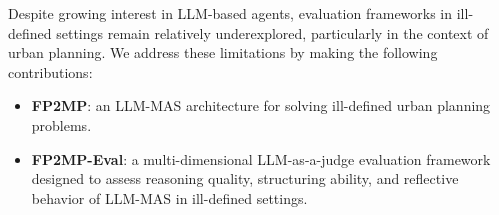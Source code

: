 Despite growing interest in LLM-based agents, evaluation frameworks in ill-defined settings remain relatively underexplored, particularly in the context of urban planning. We address these limitations by making the following contributions:

\begin{itemize}
    \item \textbf{FP2MP}: an LLM-MAS architecture for solving ill-defined urban planning problems.
    \item \textbf{FP2MP-Eval}: a multi-dimensional LLM-as-a-judge evaluation framework designed to assess reasoning quality, structuring ability, and reflective behavior of LLM-MAS in ill-defined settings.
\end{itemize}